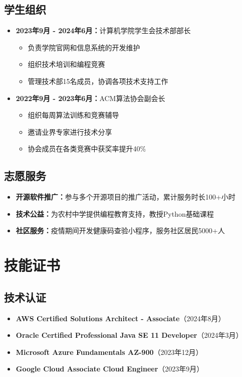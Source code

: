 \documentclass[a4paper,12pt]{article}
\begin{document}
\subsection{学生组织}
\begin{itemize}
    \item \textbf{2023年9月 - 2024年6月：}计算机学院学生会技术部部长
    \begin{itemize}
        \item 负责学院官网和信息系统的开发维护
        \item 组织技术培训和编程竞赛
        \item 管理技术部15名成员，协调各项技术支持工作
    \end{itemize}
    \item \textbf{2022年9月 - 2023年6月：}ACM算法协会副会长
    \begin{itemize}
        \item 组织每周算法训练和竞赛辅导
        \item 邀请业界专家进行技术分享
        \item 协会成员在各类竞赛中获奖率提升40\%
    \end{itemize}
\end{itemize}

\subsection{志愿服务}
\begin{itemize}
    \item \textbf{开源软件推广：}参与多个开源项目的推广活动，累计服务时长100+小时
    \item \textbf{技术公益：}为农村中学提供编程教育支持，教授Python基础课程
    \item \textbf{社区服务：}疫情期间开发健康码查验小程序，服务社区居民5000+人
\end{itemize}

\section{技能证书}

\subsection{技术认证}
\begin{itemize}
    \item \textbf{AWS Certified Solutions Architect - Associate}（2024年8月）
    \item \textbf{Oracle Certified Professional Java SE 11 Developer}（2024年3月）
    \item \textbf{Microsoft Azure Fundamentals AZ-900}（2023年12月）
    \item \textbf{Google Cloud Associate Cloud Engineer}（2023年9月）
\end{itemize}
\end{document}
